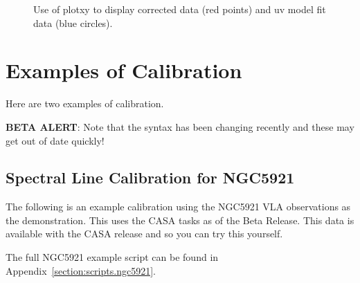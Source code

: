 \begin{figure}[h!]
\begin{center}
\caption{\label{fig:modelfit} Use of plotxy to display corrected data
  (red points) and uv model fit data (blue circles).} 
\hrulefill
\end{center}
\end{figure}

\section{Examples of Calibration}
\label{section:cal.examples}

Here are two examples of calibration.

{\bf BETA ALERT}: Note that the syntax has been changing recently
and these may get out of date quickly!

\subsection{Spectral Line Calibration for NGC5921}
\label{section:cal.examples.n5921}

The following is an example calibration using the NGC5921 VLA
observations as the demonstration.  This uses the CASA tasks
as of the Beta Release.  This data is available with the CASA
release and so you can try this yourself.

The full NGC5921 example script can be found in
Appendix~\ref{section:scripts.ngc5921}.


